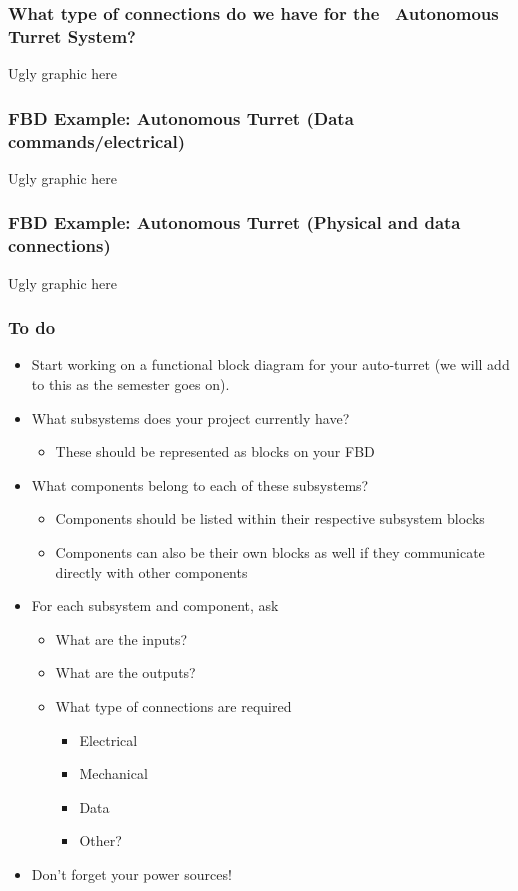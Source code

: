 \documentclass[aspectratio=169]{beamer}
\begin{document}
\begin{frame}
\frametitle{What type of connections do we have for the \usnaCourseNumber\ Autonomous Turret System?}
Ugly graphic here
\end{frame}

\begin{frame}
\frametitle{FBD Example: Autonomous Turret (Data commands/electrical)}
Ugly graphic here
\end{frame}

\begin{frame}
\frametitle{FBD Example: Autonomous Turret (Physical and data connections)}
Ugly graphic here
\end{frame}

\begin{frame}
\frametitle{To do}
\begin{itemize}
\item Start working on a functional block diagram for your auto-turret (we will add to this as the semester goes on). 
\item What subsystems does your project currently have? 
\begin{itemize}
\item These should be represented as blocks on your FBD
\end{itemize}
\item What components belong to each of these subsystems?
\begin{itemize}
\item Components should be listed within their respective subsystem blocks
\item Components can also be their own blocks as well if they communicate directly with other components
\end{itemize}
\item For each subsystem and component, ask
\begin{itemize}
\item What are the inputs?
\item What are the outputs?
\item What type of connections are required 
\begin{itemize}
\item Electrical
\item Mechanical
\item Data
\item Other?
\end{itemize}
\end{itemize}
\item Don’t forget your power sources!
\end{itemize}
\end{frame}
\end{document}
